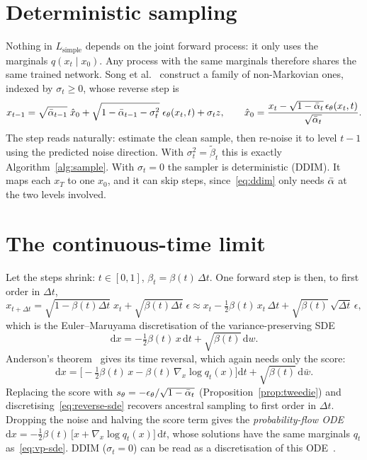 \section{Deterministic sampling}\label{sec:ddim}
Nothing in $L_{\text{simple}}$ depends on the joint forward process: it only uses the marginals $q(x_t \mid x_0)$.
Any process with the same marginals therefore shares the same trained network.
Song et al.~\cite{song2021ddim} construct a family of non-Markovian ones, indexed by $\sigma_t \ge 0$, whose reverse step is
\begin{equation}\label{eq:ddim}
  x_{t-1} = \sqrt{\bar\alpha_{t-1}}\;\hat x_0
  + \sqrt{1-\bar\alpha_{t-1}-\sigma_t^2}\;\epsilon_\theta(x_t, t) + \sigma_t z,
  \qquad
  \hat x_0 = \frac{x_t - \sqrt{1-\bar\alpha_t}\,\epsilon_\theta(x_t, t)}{\sqrt{\bar\alpha_t}} .
\end{equation}
The step reads naturally: estimate the clean sample, then re-noise it to level $t-1$ using the predicted noise direction.
With $\sigma_t^2 = \tilde\beta_t$ this is exactly Algorithm~\ref{alg:sample}.
With $\sigma_t = 0$ the sampler is deterministic (DDIM). It maps each $x_T$ to one $x_0$, and it can skip steps, since~\eqref{eq:ddim} only needs $\bar\alpha$ at the two levels involved.

\section{The continuous-time limit}\label{sec:sde}
Let the steps shrink: $t \in [0, 1]$, $\beta_t = \beta(t)\,\Delta t$.
One forward step is then, to first order in $\Delta t$,
\begin{equation*}
  x_{t+\Delta t} = \sqrt{1-\beta(t)\Delta t}\;x_t + \sqrt{\beta(t)\Delta t}\;\epsilon
  \approx x_t - \tfrac12 \beta(t)\,x_t\,\Delta t + \sqrt{\beta(t)}\,\sqrt{\Delta t}\,\epsilon ,
\end{equation*}
which is the Euler--Maruyama discretisation of the variance-preserving SDE~\cite{song2021sde}
\begin{equation}\label{eq:vp-sde}
  \mathrm{d}x = -\tfrac12 \beta(t)\,x\,\mathrm{d}t + \sqrt{\beta(t)}\,\mathrm{d}w .
\end{equation}
Anderson's theorem~\cite{anderson1982} gives its time reversal, which again needs only the score:
\begin{equation}\label{eq:reverse-sde}
  \mathrm{d}x = \Big[-\tfrac12 \beta(t)\,x - \beta(t)\,\nabla_x \log q_t(x)\Big]\mathrm{d}t + \sqrt{\beta(t)}\,\mathrm{d}\bar w .
\end{equation}
Replacing the score with $s_\theta = -\epsilon_\theta/\sqrt{1-\bar\alpha_t}$ (Proposition~\ref{prop:tweedie}) and discretising~\eqref{eq:reverse-sde} recovers ancestral sampling to first order in $\Delta t$.
Dropping the noise and halving the score term gives the \emph{probability-flow ODE}
$\mathrm{d}x = -\tfrac12 \beta(t)\,\big[x + \nabla_x \log q_t(x)\big]\,\mathrm{d}t$, whose solutions have the same marginals $q_t$ as~\eqref{eq:vp-sde}. DDIM ($\sigma_t = 0$) can be read as a discretisation of this ODE~\cite{song2021ddim}.

